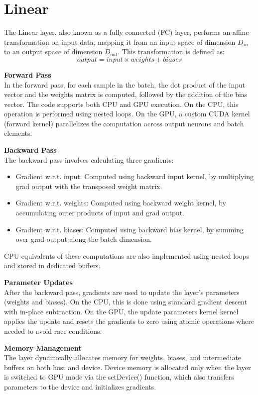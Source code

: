 \section{Linear}

The Linear layer, also known as a fully connected (FC) layer, performs an affine transformation on input data, mapping it from an input space of dimension $D_{in}$ to an output space of dimension $D_{out}$. This transformation is defined as:
$$output = input × weights + biases$$

\textbf{Forward Pass}\\
In the forward pass, for each sample in the batch, the dot product of the input vector and the weights matrix is computed, followed by the addition of the bias vector. The code supports both CPU and GPU execution. On the CPU, this operation is performed using nested loops. On the GPU, a custom CUDA kernel (forward kernel) parallelizes the computation across output neurons and batch elements.

\textbf{Backward Pass}\\
The backward pass involves calculating three gradients:
\begin{itemize}
    \item Gradient w.r.t. input: Computed using backward input kernel, by multiplying grad output with the transposed weight matrix.
    \item Gradient w.r.t. weights: Computed using backward weight kernel, by accumulating outer products of input and grad output.
    \item Gradient w.r.t. biases: Computed using backward bias kernel, by summing over grad output along the batch dimension.
\end{itemize}

CPU equivalents of these computations are also implemented using nested loops and stored in dedicated buffers.

\textbf{Parameter Updates}\\
After the backward pass, gradients are used to update the layer's parameters (weights and biases). On the CPU, this is done using standard gradient descent with in-place subtraction. On the GPU, the update parameters kernel kernel applies the update and resets the gradients to zero using atomic operations where needed to avoid race conditions.

\textbf{Memory Management}\\
The layer dynamically allocates memory for weights, biases, and intermediate buffers on both host and device. Device memory is allocated only when the layer is switched to GPU mode via the setDevice() function, which also transfers parameters to the device and initializes gradients.

